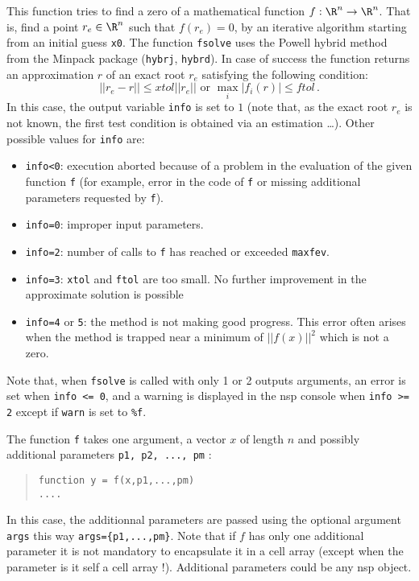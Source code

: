 \begin{mandescription}
This function tries to find a zero of a mathematical function $f: {\R}^n \rightarrow  {\R}^n$.
That is, find a point $r_e \in {\R}^n$ such that $f(r_e)=0$, by an iterative algorithm starting from an initial guess \verb+x0+.
The function \verb+fsolve+ uses the Powell hybrid method from the Minpack package (\verb+hybrj+, \verb+hybrd+). 
In case of success the function returns an approximation $r$ of an exact root $r_e$ satisfying the following condition:  
$$
|| r_e - r || \le xtol || r_e || \mbox{ or } \max_i | f_i(r) | \le ftol\,.
$$
In this case, the output variable \verb+info+ is set to $1$ (note that, as the exact root  $r_e$
is not known, the first test condition is obtained via an estimation \ldots). Other possible values
for \verb+info+ are:
\begin{itemize}
\item \verb+info<0+: execution aborted because of a problem in the evaluation of the given function \verb+f+ 
  (for example, error in the code of \verb+f+ or missing additional parameters requested by \verb+f+).
\item \verb+info=0+: improper input parameters.
\item \verb+info=2+: number of calls to \verb+f+ has reached or exceeded \verb+maxfev+.
\item \verb+info=3+: \verb+xtol+ and \verb+ftol+ are too small. No further improvement in the approximate solution is possible
\item \verb+info=4+ or \verb+5+: the method is not making good progress. This error often arises when the method
  is trapped near a minimum of $||f(x)||^2$ which is not a zero.
\end{itemize}
Note that, when \verb+fsolve+ is called with only 1 or 2 outputs arguments, an error is set 
when \verb+info <= 0+, and a warning is displayed in the nsp console when \verb+info >= 2+ except 
if \verb+warn+ is set to \verb+%f+. 

The function \verb+f+ takes one argument, a vector $x$ of length $n$ and possibly additional
parameters \verb+p1, p2, ..., pm+ :
\begin{quote}
{\tt function y = f(x,p1,...,pm) \\
      ....}
\end{quote}
In this case, the additionnal parameters are passed using the optional argument {\tt args}
this way \verb+args={p1,...,pm}+. Note that if $f$ has only one additional parameter it 
is not mandatory to encapsulate it in a cell array (except when the parameter is it self 
a cell array !). Additional parameters could be any nsp object. 


\end{mandescription}
